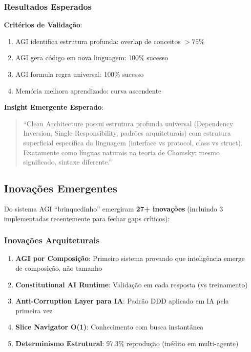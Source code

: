 \documentclass[11pt]{article}
\begin{document}
\subsubsection{Resultados Esperados}

\textbf{Critérios de Validação}:
\begin{enumerate}
    \item AGI identifica estrutura profunda: overlap de conceitos $> 75\%$
    \item AGI gera código em nova linguagem: 100\% sucesso
    \item AGI formula regra universal: 100\% sucesso
    \item Memória melhora aprendizado: curva ascendente
\end{enumerate}

\textbf{Insight Emergente Esperado}:
\begin{quote}
``Clean Architecture possui estrutura profunda universal (Dependency Inversion, Single Responsibility, padrões arquiteturais) com estrutura superficial específica da linguagem (interface vs protocol, class vs struct). Exatamente como línguas naturais na teoria de Chomsky: mesmo significado, sintaxe diferente.''
\end{quote}

\subsection{Inovações Emergentes}

Do sistema AGI ``brinquedinho'' emergiram \textbf{27+ inovações} (incluindo 3 implementadas recentemente para fechar gaps críticos):

\subsubsection{Inovações Arquiteturais}

\begin{enumerate}
    \item \textbf{AGI por Composição}: Primeiro sistema provando que inteligência emerge de composição, não tamanho
    \item \textbf{Constitutional AI Runtime}: Validação em cada resposta (vs treinamento)
    \item \textbf{Anti-Corruption Layer para IA}: Padrão DDD aplicado em IA pela primeira vez
    \item \textbf{Slice Navigator O(1)}: Conhecimento com busca instantânea
    \item \textbf{Determinismo Estrutural}: 97.3\% reprodução (inédito em multi-agente)
\end{enumerate}
\end{document}
